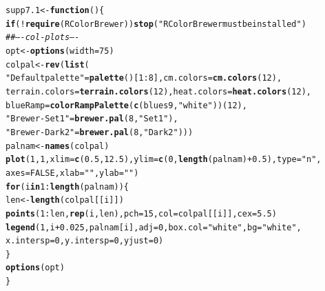 \documentclass[12pt, a4paper,  BCOR=8.25mm, DIV=15]{scrartcl}\usepackage[]{graphicx}\usepackage[]{color}
\makeatletter
\newcommand{\hlnum}[1]{\textcolor[rgb]{0.686,0.059,0.569}{#1}}%
\newcommand{\hlstr}[1]{\textcolor[rgb]{0.192,0.494,0.8}{#1}}%
\newcommand{\hlcom}[1]{\textcolor[rgb]{0.678,0.584,0.686}{\textit{#1}}}%
\newcommand{\hlopt}[1]{\textcolor[rgb]{0,0,0}{#1}}%
\newcommand{\hlstd}[1]{\textcolor[rgb]{0.345,0.345,0.345}{#1}}%
\newcommand{\hlkwa}[1]{\textcolor[rgb]{0.161,0.373,0.58}{\textbf{#1}}}%
\newcommand{\hlkwb}[1]{\textcolor[rgb]{0.69,0.353,0.396}{#1}}%
\newcommand{\hlkwc}[1]{\textcolor[rgb]{0.333,0.667,0.333}{#1}}%
\newcommand{\hlkwd}[1]{\textcolor[rgb]{0.737,0.353,0.396}{\textbf{#1}}}%
\newenvironment{kframe}{%
 \def\at@end@of@kframe{}%
 \ifinner\ifhmode%
  \def\at@end@of@kframe{\end{minipage}}%
  \begin{minipage}{\columnwidth}%
 \fi\fi%
 \def\FrameCommand##1{\hskip\@totalleftmargin \hskip-\fboxsep
 \colorbox{shadecolor}{##1}\hskip-\fboxsep
     \hskip-\linewidth \hskip-\@totalleftmargin \hskip\columnwidth}%
 \MakeFramed {\advance\hsize-\width
   \@totalleftmargin\z@ \linewidth\hsize
   \@setminipage}}%
 {\par\unskip\endMakeFramed%
 \at@end@of@kframe}
\newenvironment{knitrout}{}{} %
\makeatother
\begin{document}
\begin{knitrout}
\color{fgcolor}\begin{kframe}
\begin{alltt}
\hlstd{supp7.1} \hlkwb{<-} \hlkwa{function}\hlstd{()\{}
\hlkwa{if}\hlstd{(}\hlopt{!}\hlkwd{require}\hlstd{(RColorBrewer))}\hlkwd{stop}\hlstd{(}\hlstr{"RColorBrewer must be installed"}\hlstd{)}
\hlcom{## ---- col-plots ----}
\hlstd{opt} \hlkwb{<-} \hlkwd{options}\hlstd{(}\hlkwc{width}\hlstd{=}\hlnum{75}\hlstd{)}
\hlstd{colpal} \hlkwb{<-} \hlkwd{rev}\hlstd{(}\hlkwd{list}\hlstd{(}
    \hlstr{"Default palette"} \hlstd{=} \hlkwd{palette}\hlstd{()[}\hlnum{1}\hlopt{:}\hlnum{8}\hlstd{],}  \hlkwc{cm.colors} \hlstd{=} \hlkwd{cm.colors}\hlstd{(}\hlnum{12}\hlstd{),}
    \hlkwc{terrain.colors} \hlstd{=} \hlkwd{terrain.colors}\hlstd{(}\hlnum{12}\hlstd{),} \hlkwc{heat.colors} \hlstd{=} \hlkwd{heat.colors}\hlstd{(}\hlnum{12}\hlstd{),}
    \hlkwc{blueRamp} \hlstd{=} \hlkwd{colorRampPalette}\hlstd{(}\hlkwd{c}\hlstd{(blues9,} \hlstr{"white"}\hlstd{))(}\hlnum{12}\hlstd{),}
    \hlstr{"Brewer-Set1"} \hlstd{=} \hlkwd{brewer.pal}\hlstd{(}\hlnum{8}\hlstd{,} \hlstr{"Set1"}\hlstd{),}
    \hlstr{"Brewer-Dark2"} \hlstd{=} \hlkwd{brewer.pal}\hlstd{(}\hlnum{8}\hlstd{,} \hlstr{"Dark2"}\hlstd{)))}
\hlstd{palnam} \hlkwb{<-} \hlkwd{names}\hlstd{(colpal)}
\hlkwd{plot}\hlstd{(}\hlnum{1}\hlstd{,} \hlnum{1}\hlstd{,} \hlkwc{xlim}\hlstd{=}\hlkwd{c}\hlstd{(}\hlnum{0.5}\hlstd{,}\hlnum{12.5}\hlstd{),} \hlkwc{ylim}\hlstd{=}\hlkwd{c}\hlstd{(}\hlnum{0}\hlstd{,}\hlkwd{length}\hlstd{(palnam)}\hlopt{+}\hlnum{0.5}\hlstd{),} \hlkwc{type}\hlstd{=}\hlstr{"n"}\hlstd{,}
     \hlkwc{axes}\hlstd{=}\hlnum{FALSE}\hlstd{,} \hlkwc{xlab}\hlstd{=}\hlstr{""}\hlstd{,} \hlkwc{ylab}\hlstd{=}\hlstr{""}\hlstd{)}
\hlkwa{for}\hlstd{(i} \hlkwa{in} \hlnum{1}\hlopt{:}\hlkwd{length}\hlstd{(palnam))\{}
    \hlstd{len} \hlkwb{<-} \hlkwd{length}\hlstd{(colpal[[i]])}
    \hlkwd{points}\hlstd{(}\hlnum{1}\hlopt{:}\hlstd{len,} \hlkwd{rep}\hlstd{(i,len),} \hlkwc{pch}\hlstd{=}\hlnum{15}\hlstd{,} \hlkwc{col}\hlstd{=colpal[[i]],} \hlkwc{cex}\hlstd{=}\hlnum{5.5}\hlstd{)}
    \hlkwd{legend}\hlstd{(}\hlnum{1}\hlstd{, i}\hlopt{+}\hlnum{0.025}\hlstd{, palnam[i],} \hlkwc{adj}\hlstd{=}\hlnum{0}\hlstd{,} \hlkwc{box.col}\hlstd{=}\hlstr{"white"}\hlstd{,} \hlkwc{bg}\hlstd{=}\hlstr{"white"}\hlstd{,}
           \hlkwc{x.intersp}\hlstd{=}\hlnum{0}\hlstd{,} \hlkwc{y.intersp}\hlstd{=}\hlnum{0}\hlstd{,} \hlkwc{yjust}\hlstd{=}\hlnum{0}\hlstd{)}
\hlstd{\}}
\hlkwd{options}\hlstd{(opt)}
\hlstd{\}}
\end{alltt}
\end{kframe}
\end{knitrout}
\end{document}
